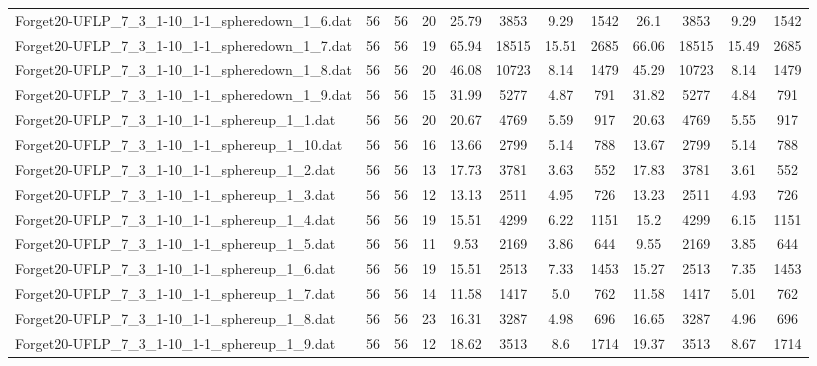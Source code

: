 \begin{sidewaystable}[!ht]
{\begin{tabular}{lccccccccccc}
Forget20-UFLP\_7\_3\_1-10\_1-1\_spheredown\_1\_6.dat & 56 & 56 & 20 & 25.79 & 3853 &  \textcolor{blue2}{9.29} & 1542 & 26.1 & 3853 &  \textcolor{blue2}{9.29} & 1542 \\
Forget20-UFLP\_7\_3\_1-10\_1-1\_spheredown\_1\_7.dat & 56 & 56 & 19 & 65.94 & 18515 & 15.51 & 2685 & 66.06 & 18515 & 15.49 & 2685 \\
Forget20-UFLP\_7\_3\_1-10\_1-1\_spheredown\_1\_8.dat & 56 & 56 & 20 & 46.08 & 10723 &  \textcolor{blue2}{8.14} & 1479 & 45.29 & 10723 &  \textcolor{blue2}{8.14} & 1479 \\
Forget20-UFLP\_7\_3\_1-10\_1-1\_spheredown\_1\_9.dat & 56 & 56 & 15 & 31.99 & 5277 & 4.87 & 791 & 31.82 & 5277 &  \textcolor{blue2}{4.84} & 791 \\
Forget20-UFLP\_7\_3\_1-10\_1-1\_sphereup\_1\_1.dat & 56 & 56 & 20 & 20.67 & 4769 & 5.59 & 917 & 20.63 & 4769 &  \textcolor{blue2}{5.55} & 917 \\
Forget20-UFLP\_7\_3\_1-10\_1-1\_sphereup\_1\_10.dat & 56 & 56 & 16 & 13.66 & 2799 &  \textcolor{blue2}{5.14} & 788 & 13.67 & 2799 &  \textcolor{blue2}{5.14} & 788 \\
Forget20-UFLP\_7\_3\_1-10\_1-1\_sphereup\_1\_2.dat & 56 & 56 & 13 & 17.73 & 3781 & 3.63 & 552 & 17.83 & 3781 &  \textcolor{blue2}{3.61} & 552 \\
Forget20-UFLP\_7\_3\_1-10\_1-1\_sphereup\_1\_3.dat & 56 & 56 & 12 & 13.13 & 2511 & 4.95 & 726 & 13.23 & 2511 &  \textcolor{blue2}{4.93} & 726 \\
Forget20-UFLP\_7\_3\_1-10\_1-1\_sphereup\_1\_4.dat & 56 & 56 & 19 & 15.51 & 4299 & 6.22 & 1151 & 15.2 & 4299 &  \textcolor{blue2}{6.15} & 1151 \\
Forget20-UFLP\_7\_3\_1-10\_1-1\_sphereup\_1\_5.dat & 56 & 56 & 11 & 9.53 & 2169 & 3.86 & 644 & 9.55 & 2169 &  \textcolor{blue2}{3.85} & 644 \\
Forget20-UFLP\_7\_3\_1-10\_1-1\_sphereup\_1\_6.dat & 56 & 56 & 19 & 15.51 & 2513 &  \textcolor{blue2}{7.33} & 1453 & 15.27 & 2513 & 7.35 & 1453 \\
Forget20-UFLP\_7\_3\_1-10\_1-1\_sphereup\_1\_7.dat & 56 & 56 & 14 & 11.58 & 1417 &  \textcolor{blue2}{5.0} & 762 & 11.58 & 1417 & 5.01 & 762 \\
Forget20-UFLP\_7\_3\_1-10\_1-1\_sphereup\_1\_8.dat & 56 & 56 & 23 & 16.31 & 3287 & 4.98 & 696 & 16.65 & 3287 &  \textcolor{blue2}{4.96} & 696 \\
Forget20-UFLP\_7\_3\_1-10\_1-1\_sphereup\_1\_9.dat & 56 & 56 & 12 & 18.62 & 3513 &  \textcolor{blue2}{8.6} & 1714 & 19.37 & 3513 & 8.67 & 1714 \\

\end{tabular}}
\end{sidewaystable}
